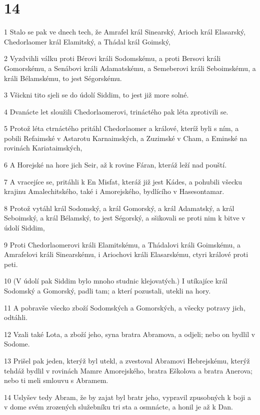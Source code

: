 \chapter{14}

\par 1 Stalo se pak ve dnech tech, že Amrafel král Sinearský, Arioch král Elasarský, Chedorlaomer král Elamitský, a Thádal král Goimský,
\par 2 Vyzdvihli válku proti Bérovi králi Sodomskému, a proti Bersovi králi Gomorskému, a Senábovi králi Adamatskému, a Semeberovi králi Seboimskému, a králi Bélamskému, to jest Ségorskému.
\par 3 Všickni tito sjeli se do údolí Siddim, to jest již more solné.
\par 4 Dvanácte let sloužili Chedorlaomerovi, trináctého pak léta zprotivili se.
\par 5 Protož léta ctrnáctého pritáhl Chedorlaomer a králové, kteríž byli s ním, a pobili Refaimské v Astarotu Karnaimských, a Zuzimské v Cham, a Eminské na rovinách Kariataimských,
\par 6 A Horejské na hore jich Seir, až k rovine Fáran, kteráž leží nad pouští.
\par 7 A vracejíce se, pritáhli k En Misfat, kteráž již jest Kádes, a pohubili všecku krajinu Amalechitského, také i Amorejského, bydlícího v Hasesontamar.
\par 8 Protož vytáhl král Sodomský, a král Gomorský, a král Adamatský, a král Seboimský, a král Bélamský, to jest Ségorský, a sšikovali se proti nim k bitve v údolí Siddim,
\par 9 Proti Chedorlaomerovi králi Elamitskému, a Thádalovi králi Goimskému, a Amrafelovi králi Sinearskému, i Ariochovi králi Elasarskému, ctyri králové proti peti.
\par 10 (V údolí pak Siddim bylo mnoho studnic klejovatých.) I utíkajíce král Sodomský a Gomorský, padli tam; a kterí pozustali, utekli na hory.
\par 11 A pobravše všecko zboží Sodomských a Gomorských, a všecky potravy jich, odtáhli.
\par 12 Vzali také Lota, a zboží jeho, syna bratra Abramova, a odjeli; nebo on bydlil v Sodome.
\par 13 Prišel pak jeden, kterýž byl utekl, a zvestoval Abramovi Hebrejskému, kterýž tehdáž bydlil v rovinách Mamre Amorejského, bratra Eškolova a bratra Anerova; nebo ti meli smlouvu s Abramem.
\par 14 Uslyšev tedy Abram, že by zajat byl bratr jeho, vypravil zpusobných k boji a v dome svém zrozených služebníku tri sta a osmnácte, a honil je až k Dan.
